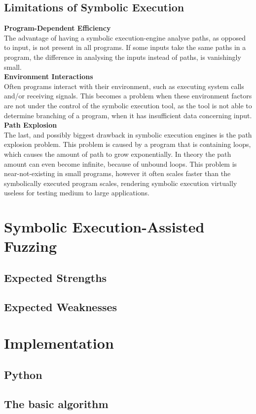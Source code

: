 \documentclass[a4paper]{article}
\newcommand{\tbf}[1]{\textbf{#1}}
\begin{document}
\subsection{Limitations of Symbolic Execution}
\tbf{Program-Dependent Efficiency}\\
The advantage of having a symbolic execution-engine analyse paths, as opposed to input, is not present in all programs. If some inputs take the same paths in a program, the difference in analysing the inputs instead of paths, is vanishingly small.\\
\tbf{Environment Interactions}\\
Often programs interact with their environment, such as executing system calls and/or receiving signals. This becomes a problem when these environment factors are not under the control of the symbolic execution tool, as the tool is not able to determine branching of a program, when it has insufficient data concerning input.\\
\tbf{Path Explosion}\\
The last, and possibly biggest drawback in symbolic execution engines is the path explosion problem. This problem is caused by a program that is containing loops, which causes the amount of path to grow exponentially. In theory the path amount can even become infinite, because of unbound loops. This problem is near-not-existing in small programs, however it often scales faster than the symbolically executed program scales, rendering symbolic execution virtually useless for testing medium to large applications.
\section{Symbolic Execution-Assisted Fuzzing}
\subsection{Expected Strengths}
\subsection{Expected Weaknesses}

\section{Implementation}
\subsection{Python}
\subsection{The basic algorithm}
\end{document}
